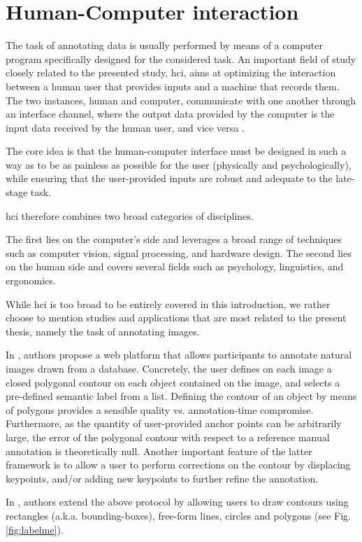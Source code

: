 \section{Human-Computer interaction}

The task of annotating data is usually performed by means of a computer program
specifically designed for the considered task.
An important field of study closely related to the presented study, \gls{hci}, aims at optimizing the interaction
between a human user that provides inputs and a machine that records them.
The two instances, human and computer, communicate with one another through an interface channel, where
the output data provided by the computer is the input data received by the human user, and vice versa \cite{dix00}.

The core idea is that the human-computer interface must be designed in such
a way as to be as painless as possible
for the user (physically and psychologically), while ensuring that the user-provided inputs are
robust and adequate to the late-stage task.

\Gls{hci} therefore combines two broad categories of disciplines.

The first lies on the computer's side and leverages a broad range of techniques such as computer vision,
signal processing, and hardware design.
The second lies on the human side and covers several fields such as psychology, linguistics, and ergonomics.

While \gls{hci} is too broad to be entirely covered in this introduction, we rather choose to
mention studies and applications that are most related to the present thesis, namely the task of annotating images.

In \cite{russell08}, authors propose a web platform that allows participants to annotate
natural images drawn from a database.
Concretely, the user defines on each image a closed polygonal contour on each object contained on the image,
and selects a pre-defined semantic label from a list.
Defining the contour of an object by means of polygons
provides a sensible quality vs. annotation-time compromise.
Furthermore, as the quantity of user-provided anchor points can be arbitrarily large,
the error of the polygonal contour with respect to a reference manual annotation
is theoretically null.
Another important feature of the latter framework is to allow a user to perform corrections on the contour by
displacing keypoints, and/or adding new keypoints to further refine the annotation.

In \cite{labelme16}, authors extend the above protocol by allowing users to draw
contours using rectangles (a.k.a. bounding-boxes), free-form
lines, circles and polygons (see Fig. \ref{fig:labelme}).

